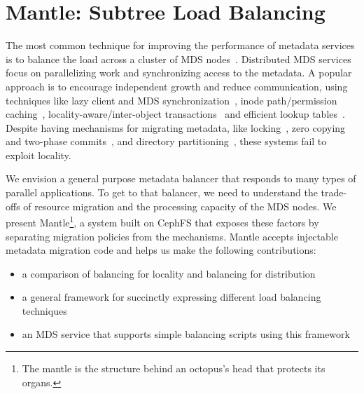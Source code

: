 \chapter{Mantle: Subtree Load Balancing}
\label{chp:mantle}

The most common technique for improving the performance of metadata services is
to balance the load across a cluster of MDS
nodes~\cite{patil:fast2011-giga+, weil:osdi2006-ceph, weil:sc2004-dyn-metadata,
sinnamohideen:atc2010-ursa, xing:sc2009-skyfs}.  Distributed MDS services focus
on parallelizing work and synchronizing access to the metadata. A popular
approach is to encourage independent growth and reduce communication, using
techniques like lazy client and MDS synchronization~\cite{patil:fast2011-giga+,
ren:sc2014-indexfs, zheng:pdsw2014-batchfs, hildebrand:msst2005-pnfs,
zhu:pds2008-hba}, inode path/permission caching~\cite{brandt:msst2003-lh,
li:msst2006-dynamic, xing:sc2009-skyfs}, locality-aware/inter-object
transactions~\cite{sinnamohideen:atc2010-ursa,zhu:pds2008-hba,ren:atc2013-tablefs,
ren:sc2014-indexfs} and efficient lookup tables~\cite{brandt:msst2003-lh,
zhu:pds2008-hba}. Despite having mechanisms for migrating metadata, like
locking~\cite{sinnamohideen:atc2010-ursa,schmuck:fast2002-gpfs}, zero copying
and two-phase commits~\cite{sinnamohideen:atc2010-ursa}, and directory
partitioning~\cite{xing:sc2009-skyfs, patil:fast2011-giga+, ren:sc2014-indexfs,
weil:osdi2006-ceph}, these systems fail to exploit locality.

We envision a general purpose metadata balancer that responds to many types of
parallel applications. To get to that balancer, we need to understand the
trade-offs of resource migration and the processing capacity of the MDS nodes.
We present Mantle\footnote{The mantle is the structure behind an octopus's head
that protects its organs.}, a system built on CephFS that exposes these factors
by separating migration policies from the mechanisms. Mantle accepts injectable
metadata migration code and helps us make the following contributions:

\begin{itemize}

    \item a comparison of balancing for locality and balancing for distribution

    \item a general framework for succinctly expressing different load
    balancing techniques 

    \item an MDS service that supports simple balancing scripts using this
    framework

\end{itemize}

